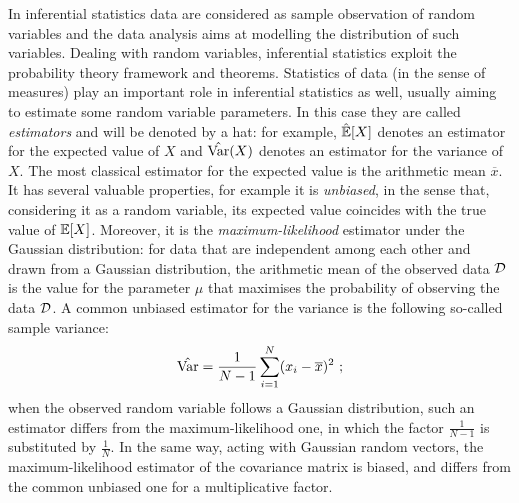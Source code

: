 In inferential statistics data are considered as sample observation of random variables and the data analysis aims at modelling the distribution of such variables. Dealing with random variables, inferential statistics exploit the probability theory framework and theorems. Statistics of data (in the sense of measures) play an important role in inferential statistics as well, usually aiming to estimate some random variable parameters. In this case they are called \emph{estimators} and will be denoted by a hat: for example, $\hat{\mathbb{E}}[X]$  denotes an estimator for the expected value of $X$ and $\hat{\mathrm{Var}}(X)$ denotes an estimator for the variance of $X$. The most classical estimator for the expected value is the arithmetic mean $\overline{x}$. It has several valuable properties, for example it is \emph{unbiased}, in the sense that, considering it as a random variable, its expected value coincides with the true value of $\mathbb{E}[X]$. Moreover, it is the \emph{maximum-likelihood} estimator under the Gaussian distribution: for data that are independent among each other and drawn from a Gaussian distribution,  the arithmetic mean of the observed data $\mathcal{D}$ is the value for the parameter $\mu$ that maximises the probability of observing the data $\mathcal{D}$. A common unbiased estimator for the variance is the following so-called sample variance: 
\begin{equation}
\hat{\mathrm{Var}} = \frac{1}{N-1}\sum_{i=1}^N(x_i-\overline{x})^2 \mbox{ ;}
\end{equation}
when the observed random variable  follows a Gaussian distribution, such an estimator differs from the maximum-likelihood one, in which the factor $\frac{1}{N-1}$ is substituted by $\frac{1}{N}$. In the same way, acting with Gaussian random vectors, the maximum-likelihood estimator of the covariance matrix is biased, and differs from the common unbiased one for a multiplicative factor. \\

